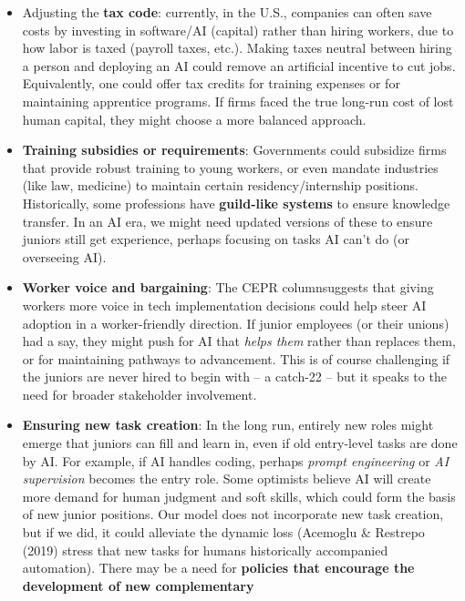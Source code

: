 \documentclass[12pt]{article}
\begin{document}
\begin{itemize}
  \begin{itemize}
  \tightlist
  \item
    Adjusting the \textbf{tax code}: currently, in the U.S., companies
    can often save costs by investing in software/AI (capital) rather
    than hiring workers, due to how labor is taxed (payroll taxes,
    etc.). Making taxes neutral between hiring a person and deploying an
    AI could remove an artificial incentive to cut jobs. Equivalently,
    one could offer tax credits for training expenses or for maintaining
    apprentice programs. If firms faced the true long-run cost of lost
    human capital, they might choose a more balanced approach.
  \item
    \textbf{Training subsidies or requirements}: Governments could
    subsidize firms that provide robust training to young workers, or
    even mandate industries (like law, medicine) to maintain certain
    residency/internship positions. Historically, some professions have
    \textbf{guild-like systems} to ensure knowledge transfer. In an AI
    era, we might need updated versions of these to ensure juniors still
    get experience, perhaps focusing on tasks AI can't do (or overseeing
    AI).
  \item
    \textbf{Worker voice and bargaining}: The CEPR columnsuggests that
    giving workers more voice in tech implementation decisions could
    help steer AI adoption in a worker-friendly direction. If junior
    employees (or their unions) had a say, they might push for AI that
    \emph{helps them} rather than replaces them, or for maintaining
    pathways to advancement. This is of course challenging if the
    juniors are never hired to begin with -- a catch-22 -- but it speaks
    to the need for broader stakeholder involvement.
  \item
    \textbf{Ensuring new task creation}: In the long run, entirely new
    roles might emerge that juniors can fill and learn in, even if old
    entry-level tasks are done by AI. For example, if AI handles coding,
    perhaps \emph{prompt engineering} or \emph{AI supervision} becomes
    the entry role. Some optimists believe AI will create more demand
    for human judgment and soft skills, which could form the basis of
    new junior positions. Our model does not incorporate new task
    creation, but if we did, it could alleviate the dynamic loss
    (Acemoglu \& Restrepo (2019) stress that new tasks for humans
    historically accompanied automation). There may be a need for
    \textbf{policies that encourage the development of new complementary
}
\end{itemize}
\end{itemize}
\end{document}
